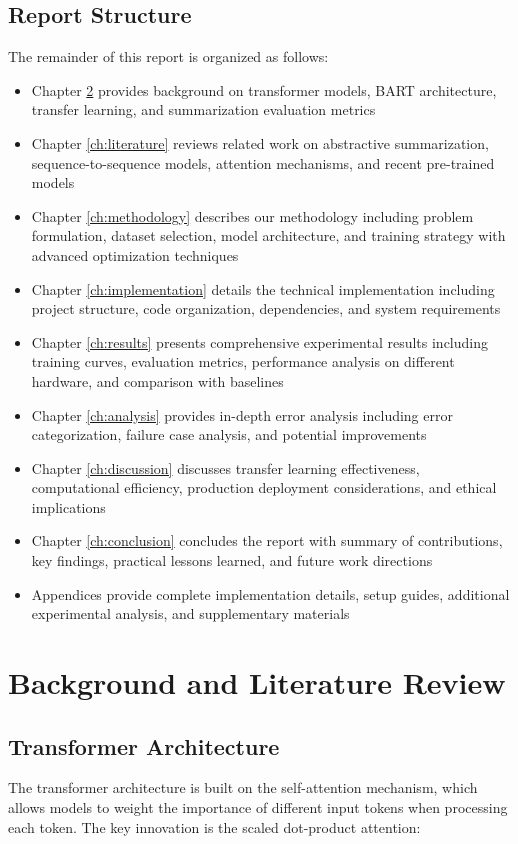 \documentclass[12pt,a4paper,oneside]{report}
\begin{document}
\section{Report Structure}
The remainder of this report is organized as follows: 
\begin{itemize}
    \item Chapter \ref{ch:background} provides background on transformer models, BART architecture, transfer learning, and summarization evaluation metrics
    \item Chapter \ref{ch:literature} reviews related work on abstractive summarization, sequence-to-sequence models, attention mechanisms, and recent pre-trained models
    \item Chapter \ref{ch:methodology} describes our methodology including problem formulation, dataset selection, model architecture, and training strategy with advanced optimization techniques
    \item Chapter \ref{ch:implementation} details the technical implementation including project structure, code organization, dependencies, and system requirements
    \item Chapter \ref{ch:results} presents comprehensive experimental results including training curves, evaluation metrics, performance analysis on different hardware, and comparison with baselines
    \item Chapter \ref{ch:analysis} provides in-depth error analysis including error categorization, failure case analysis, and potential improvements
    \item Chapter \ref{ch:discussion} discusses transfer learning effectiveness, computational efficiency, production deployment considerations, and ethical implications
    \item Chapter \ref{ch:conclusion} concludes the report with summary of contributions, key findings, practical lessons learned, and future work directions
    \item Appendices provide complete implementation details, setup guides, additional experimental analysis, and supplementary materials
\end{itemize}

\chapter{Background and Literature Review}
\label{ch:background}
\label{ch:literature}

\section{Transformer Architecture}
The transformer architecture is built on the self-attention mechanism, which allows models to weight the importance of different input tokens when processing each token. The key innovation is the scaled dot-product attention:
\end{document}
